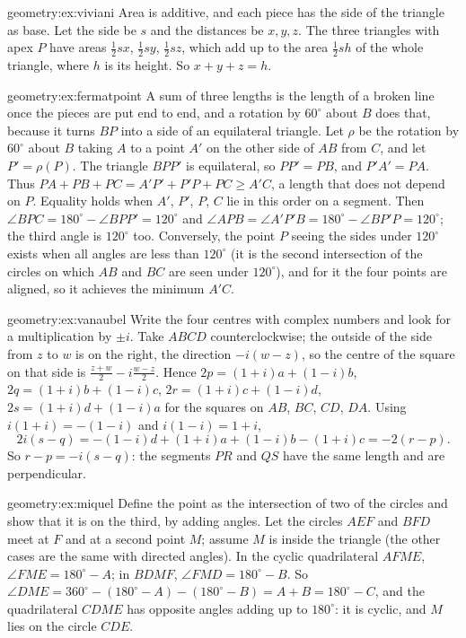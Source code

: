 \begin{solution}{geometry:ex:viviani}
\idea Area is additive, and each piece has the side of the triangle as base.
\writeup Let the side be $s$ and the distances be $x,y,z$. The three triangles with apex $P$ have areas $\frac12sx$, $\frac12sy$, $\frac12sz$,
which add up to the area $\frac12sh$ of the whole triangle, where $h$ is its height. So $x+y+z=h$.
\end{solution}

\begin{solution}{geometry:ex:fermatpoint}
\idea A sum of three lengths is the length of a broken line once the pieces are put end to end, and a rotation by $60^\circ$ about $B$ does
that, because it turns $BP$ into a side of an equilateral triangle.
\writeup Let $\rho$ be the rotation by $60^\circ$ about $B$ taking $A$ to a point $A'$ on the other side of $AB$ from $C$, and let
$P'=\rho(P)$. The triangle $BPP'$ is equilateral, so $PP'=PB$, and $P'A'=PA$. Thus $PA+PB+PC=A'P'+P'P+PC\ge A'C$, a length that does not
depend on $P$. Equality holds when $A'$, $P'$, $P$, $C$ lie in this order on a segment. Then $\angle BPC=180^\circ-\angle BPP'=120^\circ$
and $\angle APB=\angle A'P'B=180^\circ-\angle BP'P=120^\circ$; the third angle is $120^\circ$ too. Conversely, the point $P$ seeing the sides
under $120^\circ$ exists when all angles are less than $120^\circ$ (it is the second intersection of the circles on which $AB$ and $BC$ are
seen under $120^\circ$), and for it the four points are aligned, so it achieves the minimum $A'C$.
\end{solution}

\begin{solution}{geometry:ex:vanaubel}
\idea Write the four centres with complex numbers and look for a multiplication by $\pm i$.
\writeup Take $ABCD$ counterclockwise; the outside of the side from $z$ to $w$ is on the right, the direction $-i(w-z)$, so the centre of the
square on that side is $\frac{z+w}2-i\frac{w-z}2$. Hence $2p=(1+i)a+(1-i)b$, $2q=(1+i)b+(1-i)c$, $2r=(1+i)c+(1-i)d$, $2s=(1+i)d+(1-i)a$
for the squares on $AB$, $BC$, $CD$, $DA$. Using $i(1+i)=-(1-i)$ and $i(1-i)=1+i$,
\[
2i(s-q)=-(1-i)d+(1+i)a+(1-i)b-(1+i)c=-2(r-p).
\]
So $r-p=-i(s-q)$: the segments $PR$ and $QS$ have the same length and are perpendicular.
\end{solution}

\begin{solution}{geometry:ex:miquel}
\idea Define the point as the intersection of two of the circles and show that it is on the third, by adding angles.
\writeup Let the circles $AEF$ and $BFD$ meet at $F$ and at a second point $M$; assume $M$ is inside the triangle (the other cases are
the same with directed angles). In the cyclic quadrilateral $AFME$, $\angle FME=180^\circ-A$; in $BDMF$, $\angle FMD=180^\circ-B$. So
$\angle DME=360^\circ-(180^\circ-A)-(180^\circ-B)=A+B=180^\circ-C$, and the quadrilateral $CDME$ has opposite angles adding up to $180^\circ$:
it is cyclic, and $M$ lies on the circle $CDE$.
\end{solution}

